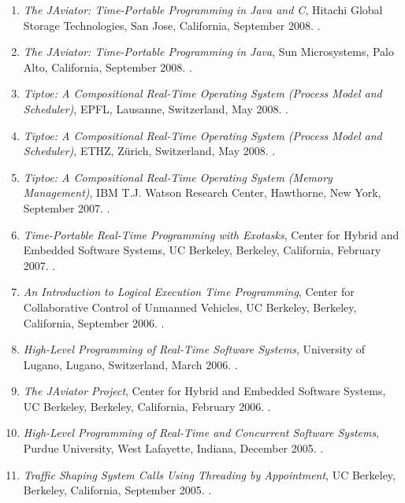 {\begin{enumerate}
\item \emph{The JAviator: Time-Portable Programming in Java and C},
Hitachi Global Storage Technologies, San Jose, California, September 2008.
.

\item \emph{The JAviator: Time-Portable Programming in Java},
Sun Microsystems, Palo Alto, California, September 2008.
.

\item \emph{Tiptoe: A Compositional Real-Time Operating System (Process Model and Scheduler)},
EPFL, Lausanne, Switzerland, May 2008.
.

\item \emph{Tiptoe: A Compositional Real-Time Operating System (Process Model and Scheduler)},
ETHZ, Z{\"u}rich, Switzerland, May 2008.
.

\item \emph{Tiptoe: A Compositional Real-Time Operating System (Memory Management)},
IBM T.J. Watson Research Center, Hawthorne, New York, September 2007.
.

\item \emph{Time-Portable Real-Time Programming with Exotasks},
Center for Hybrid and Embedded Software Systems, UC Berkeley, Berkeley, California, February 2007.
.

\item \emph{An Introduction to Logical Execution Time Programming},
Center for Collaborative Control of Unmanned Vehicles, UC Berkeley, Berkeley, California, September 2006.
.

\item \emph{High-Level Programming of Real-Time Software Systems},
University of Lugano, Lugano, Switzerland, March 2006.
.

\item \emph{The JAviator Project},
Center for Hybrid and Embedded Software Systems, UC Berkeley, Berkeley, California, February 2006.
.

\item \emph{High-Level Programming of Real-Time and Concurrent Software Systems},
Purdue University, West Lafayette, Indiana, December 2005.
.

\item \emph{Traffic Shaping System Calls Using Threading by Appointment},
UC Berkeley, Berkeley, California, September 2005.
.


\end{enumerate}}
